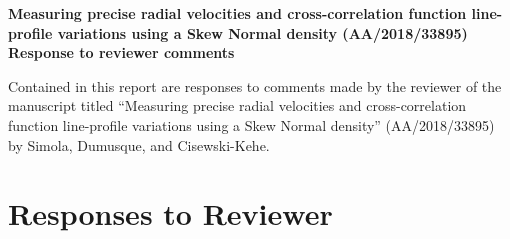 \documentclass[11pt]{article}   	%
\begin{document}
\begin{center}
{\bf Measuring precise radial velocities and cross-correlation function line-profile variations using a Skew Normal density (AA/2018/33895)\\
Response to reviewer comments}
\end{center}

Contained in this report are responses to comments made by the reviewer of the manuscript titled ``Measuring precise radial velocities and cross-correlation function line-profile variations using a Skew Normal density'' (AA/2018/33895) by Simola, Dumusque, and Cisewski-Kehe.  


\section{Responses to Reviewer}
\end{document}
